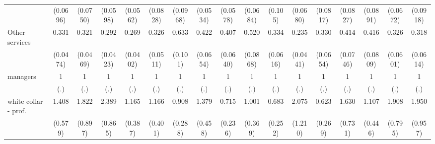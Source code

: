 {\begin{tabular}{l*{16}{c}}
                    &    (0.0696)         &    (0.0750)         &    (0.0598)         &    (0.0562)         &    (0.0828)         &    (0.0968)         &    (0.0534)         &    (0.0578)         &    (0.0684)         &     (0.105)         &    (0.0680)         &    (0.0817)         &    (0.0827)         &    (0.0891)         &    (0.0672)         &    (0.0918)         \\
[1em]
Other services      &       0.331\sym{***}&       0.321\sym{***}&       0.292\sym{***}&       0.269\sym{***}&       0.326\sym{***}&       0.633\sym{**} &       0.422\sym{***}&       0.407\sym{***}&       0.520\sym{***}&       0.334\sym{***}&       0.235\sym{***}&       0.330\sym{***}&       0.414\sym{***}&       0.416\sym{***}&       0.326\sym{***}&       0.318\sym{***}\\
                    &    (0.0474)         &    (0.0469)         &    (0.0423)         &    (0.0402)         &    (0.0511)         &     (0.101)         &    (0.0654)         &    (0.0640)         &    (0.0868)         &    (0.0616)         &    (0.0441)         &    (0.0654)         &    (0.0746)         &    (0.0809)         &    (0.0601)         &    (0.0614)         \\
[1em]
managers            &           1         &           1         &           1         &           1         &           1         &           1         &           1         &           1         &           1         &           1         &           1         &           1         &           1         &           1         &           1         &           1         \\
                    &         (.)         &         (.)         &         (.)         &         (.)         &         (.)         &         (.)         &         (.)         &         (.)         &         (.)         &         (.)         &         (.)         &         (.)         &         (.)         &         (.)         &         (.)         &         (.)         \\
[1em]
white collar - prof.&       1.408         &       1.822         &       2.389\sym{*}  &       1.165         &       1.166         &       0.908         &       1.379         &       0.715         &       1.001         &       0.683         &       2.075         &       0.623         &       1.630         &       1.107         &       1.908         &       1.950         \\
                    &     (0.579)         &     (0.897)         &     (0.865)         &     (0.387)         &     (0.401)         &     (0.288)         &     (0.458)         &     (0.236)         &     (0.369)         &     (0.252)         &     (1.210)         &     (0.269)         &     (0.731)         &     (0.446)         &     (0.795)         &     (0.957)         \\

\end{tabular}}
